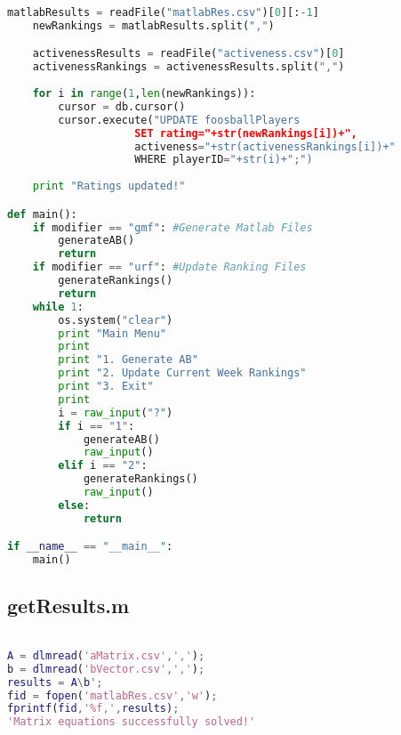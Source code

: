 \documentclass[12pt, letterpaper]{article}
\begin{document}
\begin{lstlisting}[language=python]
    matlabResults = readFile("matlabRes.csv")[0][:-1]
    newRankings = matlabResults.split(",")

    activenessResults = readFile("activeness.csv")[0]
    activenessRankings = activenessResults.split(",")
        
    for i in range(1,len(newRankings)):
        cursor = db.cursor()
        cursor.execute("UPDATE foosballPlayers
                    SET rating="+str(newRankings[i])+",
                    activeness="+str(activenessRankings[i])+"
                    WHERE playerID="+str(i)+";")
        
    print "Ratings updated!"

def main():
    if modifier == "gmf": #Generate Matlab Files
        generateAB()
        return
    if modifier == "urf": #Update Ranking Files
        generateRankings()
        return
    while 1:
        os.system("clear")
        print "Main Menu"
        print
        print "1. Generate AB"
        print "2. Update Current Week Rankings"
        print "3. Exit"
        print
        i = raw_input("?")
        if i == "1":
            generateAB()
            raw_input()
        elif i == "2":
            generateRankings()
            raw_input()
        else:
            return

if __name__ == "__main__":
    main()

\end{lstlisting}

\subsection{getResults.m}

\begin{lstlisting}[language=matlab]

A = dlmread('aMatrix.csv',',');
b = dlmread('bVector.csv',',');
results = A\b';
fid = fopen('matlabRes.csv','w');
fprintf(fid,'%f,',results);
'Matrix equations successfully solved!'

\end{lstlisting}

\newpage




\end{document}
